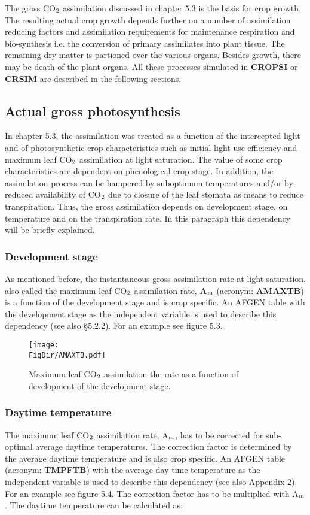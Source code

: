 The gross CO$_{{\rm 2}}$ assimilation discussed in chapter 5.3 is the basis for crop growth. The
resulting actual crop growth depends further on a number of assimilation reducing factors
and assimilation requirements for maintenance respiration and bio-synthesis i.e. the
conversion of primary assimilates into plant tissue. The remaining dry matter is partioned
over the various organs. Besides growth, there may be death of the plant organs. All
these processes simulated in {\bf CROPSI} or {\bf CRSIM} are described in the following sections.

\subsection{Actual gross photosynthesis}

In chapter 5.3, the assimilation was treated as a function of the intercepted light and of
photosynthetic crop characteristics such as initial light use efficiency and maximum leaf
CO$_{{\rm 2}}$ assimilation at light saturation. The value of some crop characteristics are dependent
on phenological crop stage. In addition, the assimilation process can be hampered by
suboptimum temperatures and/or by reduced availability of CO$_{{\rm 2}}$ due to closure of the leaf
stomata as means to reduce transpiration. Thus, the gross assimila\-tion depends on
development stage, on temperature and on the transpiration rate. In this para\-graph this
dependency will be briefly explained.

\subsubsection{Development stage}
As mentioned before, the instantaneous gross assimilation rate at light saturation, also
called the maximum leaf CO$_{{\rm 2}}$ assimilation rate, {\bf A$_{{\rm m}}$} (acronym: {\bf AMAXTB}) is a function of
the development stage and is crop specific. An AFGEN table with the development stage
as the independent variable is used to describe this dependency (see also \S 5.2.2). For an
example see figure 5.3.

\begin{figure}[p]
\centering
\texttt{[image: \\FigDir/AMAXTB.pdf]}
\caption{Maximum leaf CO$_{{\rm 2}}$ assimilation the rate as a function of develop\-ment of
the development stage.}
\end{figure}

\subsubsection{Daytime temperature}
The maximum leaf CO$_{{\rm 2}}$ assimilation rate, A$_{{\rm m}}$, has to be corrected for sub-optimal average
daytime tempera\-tures. The correction factor is determined by the average daytime
temperature and is also crop specific. An AFGEN table (acronym: {\bf TMPFTB}) with the
average day time temperature as the independent variable is used to describe this
dependency (see also Appendix 2). For an example see figure 5.4. 
The correction factor has to be multiplied with A$_{{\rm m}}$. The daytime temperature can be
calculated as:

